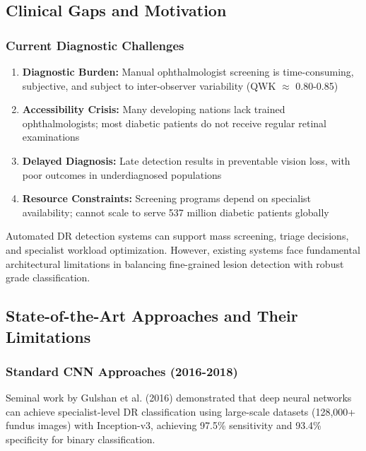 \documentclass[12pt,a4paper]{article}
\begin{document}
\subsection{Clinical Gaps and Motivation}

\subsubsection{Current Diagnostic Challenges}

\begin{enumerate}
    \item \textbf{Diagnostic Burden:} Manual ophthalmologist screening is time-consuming, subjective, and subject to inter-observer variability (QWK $\approx$ 0.80-0.85)
    \item \textbf{Accessibility Crisis:} Many developing nations lack trained ophthalmologists; most diabetic patients do not receive regular retinal examinations
    \item \textbf{Delayed Diagnosis:} Late detection results in preventable vision loss, with poor outcomes in underdiagnosed populations
    \item \textbf{Resource Constraints:} Screening programs depend on specialist availability; cannot scale to serve 537 million diabetic patients globally
\end{enumerate}

Automated DR detection systems can support mass screening, triage decisions, and specialist workload optimization. However, existing systems face fundamental architectural limitations in balancing fine-grained lesion detection with robust grade classification.

\subsection{State-of-the-Art Approaches and Their Limitations}

\subsubsection{Standard CNN Approaches (2016-2018)}

Seminal work by Gulshan et al. (2016) demonstrated that deep neural networks can achieve specialist-level DR classification using large-scale datasets (128,000+ fundus images) with Inception-v3, achieving 97.5\% sensitivity and 93.4\% specificity for binary classification.
\end{document}
